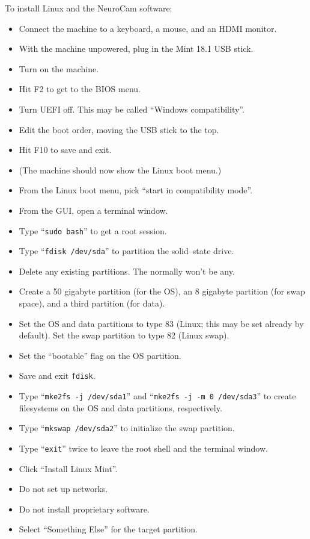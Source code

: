 To install Linux and the NeuroCam software:
\begin{itemize}
%
\item Connect the machine to a keyboard, a mouse, and an HDMI monitor.
\item With the machine unpowered, plug in the Mint 18.1 USB stick.
\item Turn on the machine.
\item Hit F2 to get to the BIOS menu.
\item Turn UEFI off. This may be called ``Windows compatibility''.
\item Edit the boot order, moving the USB stick to the top.
\item Hit F10 to save and exit.
%
\item (The machine should now show the Linux boot menu.)
\item From the Linux boot menu, pick ``start in compatibility mode''.
\item From the GUI, open a terminal window.
\item Type ``\verb+sudo bash+'' to get a root session.
\item Type ``\verb+fdisk /dev/sda+'' to partition the solid--state drive.
\item Delete any existing partitions. The normally won't be any.
\item Create a 50 gigabyte partition (for the OS), an 8 gigabyte partition
(for swap space), and a third partition (for data).
\item Set the OS and data partitions to type 83 (Linux; this may be set
already by default). Set the swap partition to type 82 (Linux swap).
\item Set the ``bootable'' flag on the OS partition.
\item Save and exit \verb+fdisk+.
\item Type ``\verb+mke2fs -j /dev/sda1+'' and
``\verb+mke2fs -j -m 0 /dev/sda3+'' to create filesystems on the OS and
data partitions, respectively.
\item Type ``\verb+mkswap /dev/sda2+'' to initialize the swap partition.
\item Type ``\verb+exit+'' twice to leave the root shell and the terminal
window.
%
\item Click ``Install Linux Mint''.
\item Do not set up networks.
\item Do not install proprietary software.
\item Select ``Something Else'' for the target partition.

\end{itemize}
